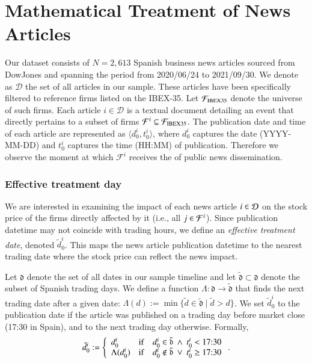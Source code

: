\section{Mathematical Treatment of News Articles}

Our dataset consists of $N=2,613$ Spanish business news articles 
 sourced from DowJones and spanning the period from 2020/06/24 to 2021/09/30. 
 We denote as $\mathcal D$ the set of all articles in our sample.
 These articles have been specifically filtered to reference firms listed on the IBEX-35.
 Let $\F_{\t{IBEX35}}$ denote the universe of such firms. 
 Each article $i \in \mathcal{D}$ is a textual document detailing an event that directly pertains to a subset of firms $\mathcal{F}^i \subseteq \F_{\t{IBEX35}}$.
The publication date and time of each article are represented as 
$\langle d_0^i, t_0^i \rangle$, 
where $d_0^i$ captures the date 
(YYYY-MM-DD) 
and $t_0^i$ captures the time
 (HH:MM) 
 of publication. 
Therefore we observe the moment at which $\mathcal{F}^i$ receives the  of public news dissemination. 

\subsubsection*{Effective treatment day}

We are interested in examining the impact of each news article $i\in\D$ on the stock price of the firms directly affected by it (i.e., all $j\in\F^i$). 
%
Since publication datetime may not coincide with trading hours, we define an \textit{effective treatment date}, denoted $\tilde d_0^i$. This maps the news article publication datetime to the nearest trading date where the stock price can reflect the news impact.

Let ${\mathfrak d}$ denote the set of all dates in our sample timeline and let $\tilde{\mathfrak d} \subset {\mathfrak d}$ denote the subset of Spanish trading days. We define a function $\Lambda:\mathfrak d \to \tilde{\mathfrak d}$ that finds the next trading date after a given date: 
$\Lambda(d) := \min \{ \tilde{d} \in \tilde{\mathfrak{d}} \mid \tilde{d} > d \}$. 
We set $\tilde d_0^i$ to the publication date if the article was published on a trading day before market close (17:30 in Spain), and to the next trading day otherwise. Formally,
\begin{align*}
\tilde{d}_0^i :=
\mycases{llll}{
d_0^i & \IF & d_0^i \in \tilde{\mathfrak d} ~\wedge~t_0^i < \t{17:30}
\\
\Lambda(d_0^i)
& \IF & d_0^i \not \in \tilde{\mathfrak d} ~\vee~t_0^i \geq \t{17:30}
}
.
\end{align*}


